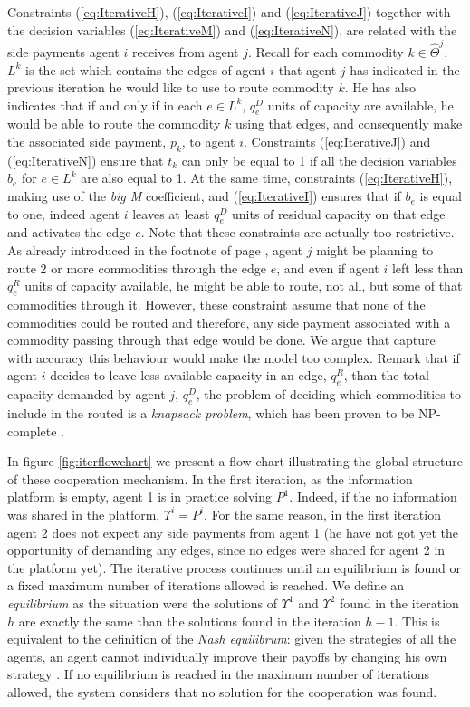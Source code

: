 \documentclass{article}
\begin{document}
Constraints (\ref{eq:IterativeH}),  (\ref{eq:IterativeI}) and (\ref{eq:IterativeJ}) together with the decision variables (\ref{eq:IterativeM}) and (\ref{eq:IterativeN}), are related with the side payments agent $i$ receives from agent $j$. Recall for each commodity $k\in \widehat{\Theta}^j$, $L^k$ is the set which contains the edges of agent $i$ that agent $j$ has indicated in the previous iteration he would like to use to route commodity $k$. He has also indicates that if and only if in each $e \in L^k$, $q_e^D$ units of capacity are available, he would be able to route the commodity $k$ using that edges, and consequently make the associated side payment, $p_k$, to agent $i$. Constraints (\ref{eq:IterativeJ}) and (\ref{eq:IterativeN}) ensure that $t_k$ can only be equal to 1 if all the decision variables $b_e$ for $e \in L^k$ are also equal to 1. At the same time, constraints (\ref{eq:IterativeH}),  making use of the \emph{big M} coefficient, and (\ref{eq:IterativeI}) ensures that if $b_e$ is equal to one, indeed agent $i$ leaves at least $q_e^D$ units of residual capacity on that edge and activates the edge $e$. Note that these constraints are actually too restrictive. As already introduced in the footnote of page \pageref{ft:sidepaymentexplanation}, agent $j$ might be planning to route 2 or more commodities through the edge $e$, and even if agent $i$ left less than $q_e^R$ units of capacity available, he might be able to route, not all, but some of that commodities through it. However, these constraint assume that none of the commodities could be routed and therefore, any side payment associated with a commodity passing through that edge would be done. We argue that capture with accuracy this behaviour would make the model too complex. Remark that if agent $i$ decides to leave less available capacity in an edge, $q_e^R$, than the total capacity demanded by agent $j$, $q_e^D$, the problem of deciding which commodities to include in the routed is a \emph{knapsack problem}, which has been proven to be NP-complete \parencite{KARP1972}.

In figure \ref{fig:iterflowchart} we present a flow chart illustrating the global structure of these cooperation mechanism.
In the first iteration, as the information platform is empty, agent 1 is in practice solving $P^1$. Indeed, if the no information was shared in the platform, $\Upsilon^i=P^i$. For the same reason, in the first iteration agent 2 does not expect any side payments from agent 1 (he have not got yet the opportunity of demanding any edges, since no edges were shared for agent 2 in the platform yet). The iterative process continues until an equilibrium is found or a fixed maximum number of iterations allowed is reached. We define an \emph{equilibrium} as the situation were the solutions of $\Upsilon^1$ and $\Upsilon^2$ found in the iteration $h$ are exactly the same than the solutions found in the iteration $h-1$. This is equivalent to the definition of the \emph{Nash equilibrum}: given the strategies of all the agents, an agent cannot individually improve their payoffs by changing his own strategy \parencite{GONZALEZ2010}. If no equilibrium is reached in the maximum number of iterations allowed, the system considers that no solution for the cooperation was found.
\end{document}
